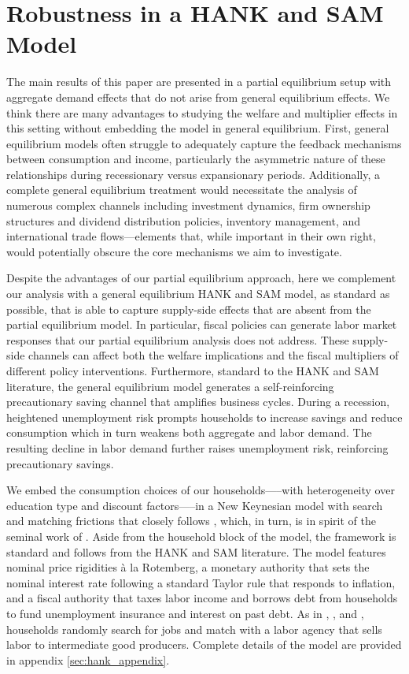 
\hypertarget{hank}{}\par\section{Robustness in a HANK and SAM Model}
\label{sec:hank}


The main results of this paper are presented in a partial equilibrium setup with aggregate demand effects that do not arise from general equilibrium effects. We think there are many advantages to studying the welfare and multiplier effects in this setting without embedding the model in general equilibrium.  First, general equilibrium models often struggle to adequately capture the feedback mechanisms between consumption and income, particularly the asymmetric nature of these relationships during recessionary versus expansionary periods. Additionally, a complete general equilibrium treatment would necessitate the analysis of numerous complex channels including investment dynamics, firm ownership structures and dividend distribution policies, inventory management, and international trade flows—elements that, while important in their own right, would potentially obscure the core mechanisms we aim to investigate.

Despite the advantages of our partial equilibrium approach, here we complement our analysis with a general equilibrium HANK and SAM model, as standard as possible, that is able to capture supply-side effects that are absent from the partial equilibrium model. In particular, fiscal policies can generate labor market responses that our partial equilibrium analysis does not address. These supply-side channels can affect both the welfare implications and the fiscal multipliers of different policy interventions. Furthermore, standard to the HANK and SAM literature, the general equilibrium model generates a self-reinforcing precautionary saving channel that amplifies business cycles. During a recession, heightened unemployment risk prompts households to increase savings and reduce consumption which in turn weakens both aggregate and labor demand. The resulting decline in labor demand further raises unemployment risk, reinforcing precautionary savings.

We embed the consumption choices of our households—--with heterogeneity over education type and discount factors—--in a New Keynesian model with search and matching frictions that closely follows \cite{Du2024}, which, in turn, is in spirit of the seminal work of \cite{Ravn2017,Ravn2021}. Aside from the household block of the model, the framework is standard and follows from the HANK and SAM literature. The model features nominal price rigidities \`{a} la Rotemberg, a monetary authority that sets the nominal interest rate following a standard Taylor rule that responds to inflation, and a fiscal authority that taxes labor income and borrows debt from households to fund unemployment insurance and interest on past debt. As in \cite{Gornemann2021}, \cite{Bardoczy2022}, and \cite{gravesUnemployment}, households randomly search for jobs and match with a labor agency that sells labor to intermediate good producers. Complete details of the model are provided in appendix \ref{sec:hank_appendix}. 

